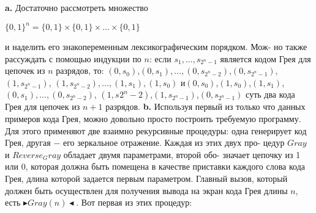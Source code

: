 \textbf{a.} Достаточно рассмотреть множество
\begin{center}
$\{0,1\}^n=\{0,1\}\times\{0,1\}\times...\times\{0,1\}$
\end{center}
и наделить его знакопеременным лексикографическим порядком. Мож­-\linebreak
но также рассуждать с помощью индукции по $n$:  если $s_1, ..., s_{2^n-1}$\linebreak
является кодом Грея для цепочек из $n$ разрядов, то:\newline
\hspace*{25pt}$(0,s_0)$,\hspace{15pt}$(0,s_1),...,(0,s_{2^n-2})$,\hspace{15pt}$(0,s_{2^n-1})$,\hspace{15pt}$(1,s_{2^n-1})$,\newline
\hspace*{250pt}$(1,s_{2^n-2}),...,(1,s_1), (1,s_0)$\newline
\hspace*{25pt}и\hspace{15pt}$(0,s_0)$,\hspace{15pt}$(1,s_0)$,\hspace{15pt}$(1,s_1)$,\hspace{15pt}$(0,s_1),...,(0,s_{2^n-2})$,\newline
\hspace*{197pt}$(1,s_{}2^n-2)$,\hspace{15pt}$(1,s_{2^n-1})$,\hspace{15pt}$(0,s_{2^n-1})$\newline
суть два кода Грея для цепочек из $n+1$ разрядов.\newline
\textbf{b.} Используя первый из только что данных примеров кода Грея,\linebreak
можно довольно просто построить требуемую программу. Для этого\linebreak
применяют две взаимно рекурсивные процедуры: одна генерирует код\linebreak
Грея, другая $-$ его зеркальное отражение. Каждая из этих двух про­-\linebreak
цедур $Gray$ и $Reverse_Gray$ обладает двумя параметрами, второй обо­-\linebreak
значает цепочку из 1 или 0, которая должна быть помещена в качестве\linebreak
приставки каждого слова кода Грея, длина которой задается первым\linebreak
параметром. Главный  вызов, который должен быть осуществлен для\linebreak
получения вывода на экран кода Грея длины $n$, есть $\blacktriangleright Gray (n) \blacktriangleleft$. Вот\linebreak
первая из этих процедур:
\newpage




